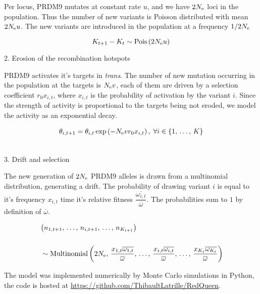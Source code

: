 \documentclass{article}
\begin{document}
Per locus, PRDM9 mutates at constant rate $u$, and we have $2 N_\mathrm{e}$ loci in the population. Thus the number of new variants is Poisson distributed with mean $2 N_\mathrm{e} u$. The new variants are introduced in the population at a frequency $1 / 2 N_\mathrm{e}$

\begin{equation}
  K_{t+1} - K_{t} \sim \operatorname{Pois} \left(2 N_\mathrm{e} u \right)
\end{equation}

2. Erosion of the recombination hotspots 

PRDM9 activates it's targets in \textit{trans}. The number of new mutation occurring in the population at the targets is $ N_\mathrm{e} v$, each of them are driven by a selection coefficient $ r _0  x_{i,t}$, where $x_{i,t}$ is the probability of activation by the variant $i$.
Since the strength of activity is proportional to the targets being not eroded, we model the activity as an exponential decay.

\begin{align}
 \theta _{i,t+1} &=  \theta _{i,t}\operatorname{exp} \left( - N_\mathrm{e} v
 r _0  x_{i,t} \right), \;
 \forall i \in \{ 1, \, \dots, \, K \} \\ \\
\end{align}

3. Drift and selection

The new generation of $2 N_\mathrm{e}$ PRDM9 alleles is drawn from a multinomial distribution, generating a drift. The probability of drawing variant $i$ is equal to it's frequency $x_{i,t}$ time it's relative fitness  $\dfrac{\overline{\omega_{i,t}}}{\overline{\omega}}$. The probabilities sum to $1$ by definition of $\overline{\omega}$.

\begin{align}
  & \left(
  n_{1, t+1}, \,
  \dots, \,
  n_{i,t+1}, \,
  \dots, \,
  n_{K_{t+1}}
  \right)\\ \\
  &  \, \sim \operatorname{Multinomial} \left(2 N_\mathrm{e}, \,
  \dfrac{x_{1,t}  \overline{\omega_{1,t}}}{\overline{\omega}}, \,
  \dots, \,
  \dfrac{x_{i,t}  \overline{\omega_{i,t}}}{\overline{\omega}}, \,
  \dots, \,
  \dfrac{x_{K_{t}} \overline{\omega_{K_{t}}}}{\overline{\omega}}  \right)
\end{align}

The model was implemented numerically by Monte Carlo simulations in Python, the code is hosted at \url{https://github.com/ThibaultLatrille/RedQueen}.
\end{document}
